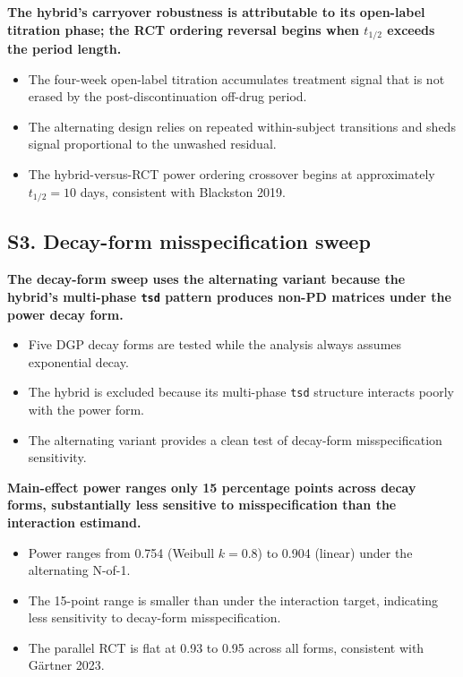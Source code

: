\documentclass[
  11pt,
]{article}
\begin{document}
\textbf{The hybrid's carryover robustness is attributable to its open-label titration phase; the RCT ordering reversal begins when $t_{1/2}$ exceeds the period length.}

\begin{itemize}\setlength{\itemsep}{2pt}\setlength{\parskip}{0pt}
\item The four-week open-label titration accumulates treatment signal that is not erased by the post-discontinuation off-drug period.
\item The alternating design relies on repeated within-subject transitions and sheds signal proportional to the unwashed residual.
\item The hybrid-versus-RCT power ordering crossover begins at approximately $t_{1/2} = 10$ days, consistent with Blackston 2019.
\end{itemize}

\subsection{S3. Decay-form misspecification sweep}\label{s3.-decay-form-misspecification-sweep}

\textbf{The decay-form sweep uses the alternating variant because the hybrid's multi-phase \texttt{tsd} pattern produces non-PD matrices under the power decay form.}

\begin{itemize}\setlength{\itemsep}{2pt}\setlength{\parskip}{0pt}
\item Five DGP decay forms are tested while the analysis always assumes exponential decay.
\item The hybrid is excluded because its multi-phase \texttt{tsd} structure interacts poorly with the power form.
\item The alternating variant provides a clean test of decay-form misspecification sensitivity.
\end{itemize}

\textbf{Main-effect power ranges only 15 percentage points across decay forms, substantially less sensitive to misspecification than the interaction estimand.}

\begin{itemize}\setlength{\itemsep}{2pt}\setlength{\parskip}{0pt}
\item Power ranges from 0.754 (Weibull $k=0.8$) to 0.904 (linear) under the alternating N-of-1.
\item The 15-point range is smaller than under the interaction target, indicating less sensitivity to decay-form misspecification.
\item The parallel RCT is flat at 0.93 to 0.95 across all forms, consistent with Gärtner 2023.
\end{itemize}
\end{document}
